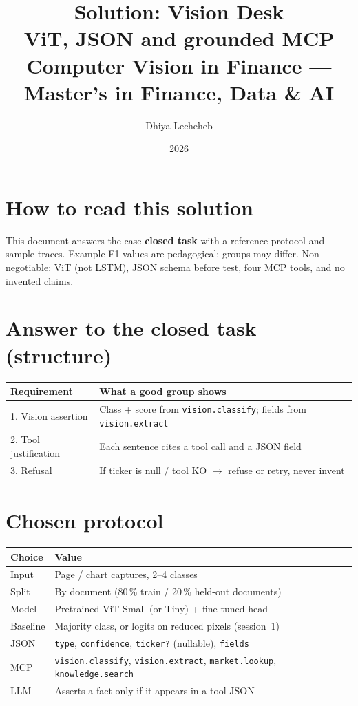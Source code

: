 \documentclass[11pt,a4paper]{article}
\title{%
  \textbf{Solution: Vision Desk}\\[0.35em]
  \large ViT, JSON and grounded MCP\\[0.5em]
  \normalsize Computer Vision in Finance --- Master's in Finance, Data \& AI
}
\author{Dhiya Lecheheb}
\date{2026}
\begin{document}
\maketitle
\thispagestyle{empty}

\section{How to read this solution}

This document answers the case \textbf{closed task} with a reference protocol
and sample traces. Example F1 values are pedagogical; groups may differ.
Non-negotiable: ViT (not LSTM), JSON schema before test, four MCP tools,
and no invented claims.

\section{Answer to the closed task (structure)}

\begin{center}
\renewcommand{\arraystretch}{1.2}
\begin{tabular}{@{}p{4.0cm}p{10.6cm}@{}}
\toprule
\textbf{Requirement} & \textbf{What a good group shows} \\
\midrule
1. Vision assertion & Class + score from \texttt{vision.classify}; fields from \texttt{vision.extract} \\
2. Tool justification & Each sentence cites a tool call and a JSON field \\
3. Refusal & If ticker is null / tool KO $\rightarrow$ refuse or retry, never invent \\
\bottomrule
\end{tabular}
\end{center}

\section{Chosen protocol}

\begin{center}
\renewcommand{\arraystretch}{1.15}
\begin{tabular}{@{}p{3.8cm}p{10.8cm}@{}}
\toprule
\textbf{Choice} & \textbf{Value} \\
\midrule
Input & Page / chart captures, 2--4 classes \\
Split & By document (80\,\% train / 20\,\% held-out documents) \\
Model & Pretrained ViT-Small (or Tiny) + fine-tuned head \\
Baseline & Majority class, or logits on reduced pixels (session~1) \\
JSON & \texttt{type}, \texttt{confidence}, \texttt{ticker?} (nullable), \texttt{fields} \\
MCP & \texttt{vision.classify}, \texttt{vision.extract}, \texttt{market.lookup}, \texttt{knowledge.search} \\
LLM & Asserts a fact only if it appears in a tool JSON \\
\bottomrule
\end{tabular}
\end{center}
\end{document}
